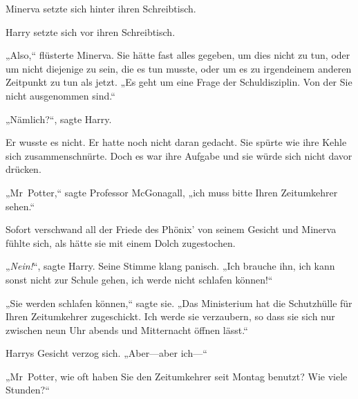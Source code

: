 Minerva setzte sich hinter ihren Schreibtisch.

Harry setzte sich vor ihren Schreibtisch.

„Also,“ flüsterte Minerva. Sie hätte fast alles gegeben, um dies nicht zu tun, oder um nicht diejenige zu sein, die es tun musste, oder um es zu irgendeinem anderen Zeitpunkt zu tun als jetzt. „Es geht um eine Frage der Schuldisziplin. Von der Sie nicht ausgenommen sind.“

„Nämlich?“, sagte Harry.

Er wusste es nicht. Er hatte noch nicht daran gedacht. Sie spürte wie ihre Kehle sich zusammenschnürte. Doch es war ihre Aufgabe und sie würde sich nicht davor drücken.

„Mr~Potter,“ sagte Professor McGonagall, „ich muss bitte Ihren Zeitumkehrer sehen.“

Sofort verschwand all der Friede des Phönix’ von seinem Gesicht und Minerva fühlte sich, als hätte sie mit einem Dolch zugestochen.

„\emph{Nein!}“, sagte Harry. Seine Stimme klang panisch. „Ich brauche ihn, ich kann sonst nicht zur Schule gehen, ich werde nicht schlafen können!“

„Sie werden schlafen können,“ sagte sie. „Das Ministerium hat die Schutzhülle für Ihren Zeitumkehrer zugeschickt. Ich werde sie verzaubern, so dass sie sich nur zwischen neun Uhr abends und Mitternacht öffnen lässt.“

Harrys Gesicht verzog sich. „Aber—aber ich—“

„Mr~Potter, wie oft haben Sie den Zeitumkehrer seit Montag benutzt? Wie viele Stunden?“

